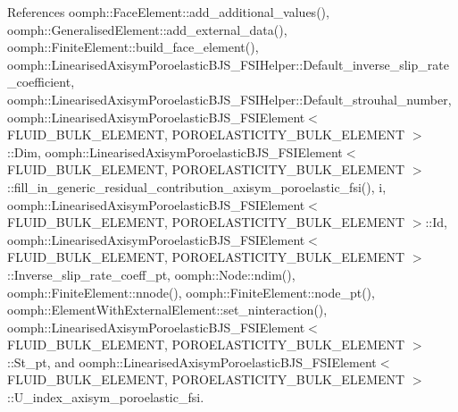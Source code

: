 References oomph\+::\+Face\+Element\+::add\+\_\+additional\+\_\+values(), oomph\+::\+Generalised\+Element\+::add\+\_\+external\+\_\+data(), oomph\+::\+Finite\+Element\+::build\+\_\+face\+\_\+element(), oomph\+::\+Linearised\+Axisym\+Poroelastic\+B\+J\+S\+\_\+\+F\+S\+I\+Helper\+::\+Default\+\_\+inverse\+\_\+slip\+\_\+rate\+\_\+coefficient, oomph\+::\+Linearised\+Axisym\+Poroelastic\+B\+J\+S\+\_\+\+F\+S\+I\+Helper\+::\+Default\+\_\+strouhal\+\_\+number, oomph\+::\+Linearised\+Axisym\+Poroelastic\+B\+J\+S\+\_\+\+F\+S\+I\+Element$<$ F\+L\+U\+I\+D\+\_\+\+B\+U\+L\+K\+\_\+\+E\+L\+E\+M\+E\+N\+T, P\+O\+R\+O\+E\+L\+A\+S\+T\+I\+C\+I\+T\+Y\+\_\+\+B\+U\+L\+K\+\_\+\+E\+L\+E\+M\+E\+N\+T $>$\+::\+Dim, oomph\+::\+Linearised\+Axisym\+Poroelastic\+B\+J\+S\+\_\+\+F\+S\+I\+Element$<$ F\+L\+U\+I\+D\+\_\+\+B\+U\+L\+K\+\_\+\+E\+L\+E\+M\+E\+N\+T, P\+O\+R\+O\+E\+L\+A\+S\+T\+I\+C\+I\+T\+Y\+\_\+\+B\+U\+L\+K\+\_\+\+E\+L\+E\+M\+E\+N\+T $>$\+::fill\+\_\+in\+\_\+generic\+\_\+residual\+\_\+contribution\+\_\+axisym\+\_\+poroelastic\+\_\+fsi(), i, oomph\+::\+Linearised\+Axisym\+Poroelastic\+B\+J\+S\+\_\+\+F\+S\+I\+Element$<$ F\+L\+U\+I\+D\+\_\+\+B\+U\+L\+K\+\_\+\+E\+L\+E\+M\+E\+N\+T, P\+O\+R\+O\+E\+L\+A\+S\+T\+I\+C\+I\+T\+Y\+\_\+\+B\+U\+L\+K\+\_\+\+E\+L\+E\+M\+E\+N\+T $>$\+::\+Id, oomph\+::\+Linearised\+Axisym\+Poroelastic\+B\+J\+S\+\_\+\+F\+S\+I\+Element$<$ F\+L\+U\+I\+D\+\_\+\+B\+U\+L\+K\+\_\+\+E\+L\+E\+M\+E\+N\+T, P\+O\+R\+O\+E\+L\+A\+S\+T\+I\+C\+I\+T\+Y\+\_\+\+B\+U\+L\+K\+\_\+\+E\+L\+E\+M\+E\+N\+T $>$\+::\+Inverse\+\_\+slip\+\_\+rate\+\_\+coeff\+\_\+pt, oomph\+::\+Node\+::ndim(), oomph\+::\+Finite\+Element\+::nnode(), oomph\+::\+Finite\+Element\+::node\+\_\+pt(), oomph\+::\+Element\+With\+External\+Element\+::set\+\_\+ninteraction(), oomph\+::\+Linearised\+Axisym\+Poroelastic\+B\+J\+S\+\_\+\+F\+S\+I\+Element$<$ F\+L\+U\+I\+D\+\_\+\+B\+U\+L\+K\+\_\+\+E\+L\+E\+M\+E\+N\+T, P\+O\+R\+O\+E\+L\+A\+S\+T\+I\+C\+I\+T\+Y\+\_\+\+B\+U\+L\+K\+\_\+\+E\+L\+E\+M\+E\+N\+T $>$\+::\+St\+\_\+pt, and oomph\+::\+Linearised\+Axisym\+Poroelastic\+B\+J\+S\+\_\+\+F\+S\+I\+Element$<$ F\+L\+U\+I\+D\+\_\+\+B\+U\+L\+K\+\_\+\+E\+L\+E\+M\+E\+N\+T, P\+O\+R\+O\+E\+L\+A\+S\+T\+I\+C\+I\+T\+Y\+\_\+\+B\+U\+L\+K\+\_\+\+E\+L\+E\+M\+E\+N\+T $>$\+::\+U\+\_\+index\+\_\+axisym\+\_\+poroelastic\+\_\+fsi.

\mbox{\label{classoomph_1_1LinearisedAxisymPoroelasticBJS__FSIElement_a17f409456685d395cabb151b547bd821}} 
